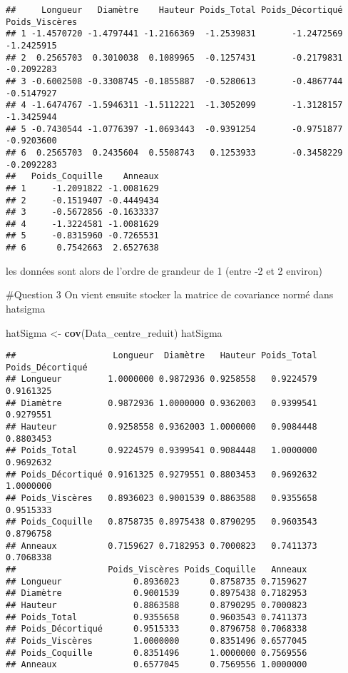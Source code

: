 \documentclass[
]{article}
\newenvironment{Shaded}{\begin{snugshade}}{\end{snugshade}}
\newcommand{\FunctionTok}[1]{\textcolor[rgb]{0.13,0.29,0.53}{\textbf{#1}}}
\newcommand{\NormalTok}[1]{#1}
\newcommand{\OtherTok}[1]{\textcolor[rgb]{0.56,0.35,0.01}{#1}}
\begin{document}
\begin{verbatim}
##     Longueur   Diamètre    Hauteur Poids_Total Poids_Décortiqué Poids_Viscères
## 1 -1.4570720 -1.4797441 -1.2166369  -1.2539831       -1.2472569     -1.2425915
## 2  0.2565703  0.3010038  0.1089965  -0.1257431       -0.2179831     -0.2092283
## 3 -0.6002508 -0.3308745 -0.1855887  -0.5280613       -0.4867744     -0.5147927
## 4 -1.6474767 -1.5946311 -1.5112221  -1.3052099       -1.3128157     -1.3425944
## 5 -0.7430544 -1.0776397 -1.0693443  -0.9391254       -0.9751877     -0.9203600
## 6  0.2565703  0.2435604  0.5508743   0.1253933       -0.3458229     -0.2092283
##   Poids_Coquille    Anneaux
## 1     -1.2091822 -1.0081629
## 2     -0.1519407 -0.4449434
## 3     -0.5672856 -0.1633337
## 4     -1.3224581 -1.0081629
## 5     -0.8315960 -0.7265531
## 6      0.7542663  2.6527638
\end{verbatim}

les données sont alors de l'ordre de grandeur de 1 (entre -2 et 2
environ)

\#Question 3 On vient ensuite stocker la matrice de covariance normé
dans hatsigma

\begin{Shaded}
\begin{Highlighting}[]
\NormalTok{hatSigma }\OtherTok{\textless{}{-}} \FunctionTok{cov}\NormalTok{(Data\_centre\_reduit)}
\NormalTok{hatSigma}
\end{Highlighting}
\end{Shaded}

\begin{verbatim}
##                   Longueur  Diamètre   Hauteur Poids_Total Poids_Décortiqué
## Longueur         1.0000000 0.9872936 0.9258558   0.9224579        0.9161325
## Diamètre         0.9872936 1.0000000 0.9362003   0.9399541        0.9279551
## Hauteur          0.9258558 0.9362003 1.0000000   0.9084448        0.8803453
## Poids_Total      0.9224579 0.9399541 0.9084448   1.0000000        0.9692632
## Poids_Décortiqué 0.9161325 0.9279551 0.8803453   0.9692632        1.0000000
## Poids_Viscères   0.8936023 0.9001539 0.8863588   0.9355658        0.9515333
## Poids_Coquille   0.8758735 0.8975438 0.8790295   0.9603543        0.8796758
## Anneaux          0.7159627 0.7182953 0.7000823   0.7411373        0.7068338
##                  Poids_Viscères Poids_Coquille   Anneaux
## Longueur              0.8936023      0.8758735 0.7159627
## Diamètre              0.9001539      0.8975438 0.7182953
## Hauteur               0.8863588      0.8790295 0.7000823
## Poids_Total           0.9355658      0.9603543 0.7411373
## Poids_Décortiqué      0.9515333      0.8796758 0.7068338
## Poids_Viscères        1.0000000      0.8351496 0.6577045
## Poids_Coquille        0.8351496      1.0000000 0.7569556
## Anneaux               0.6577045      0.7569556 1.0000000
\end{verbatim}
\end{document}
